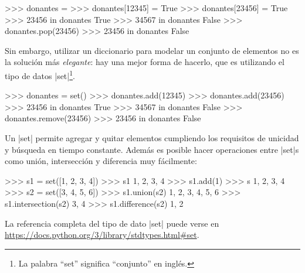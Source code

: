 \begin{subappendices}
\begin{codigo-python-sn}
>>> donantes = {}
>>> donantes[12345] = True
>>> donantes[23456] = True
>>> 23456 in donantes
True
>>> 34567 in donantes
False
>>> donantes.pop(23456)
>>> 23456 in donantes
False
\end{codigo-python-sn}

Sin embargo, utilizar un diccionario para modelar un conjunto de elementos no
es la solución más \emph{elegante}: hay una mejor forma de hacerlo, que es
utilizando el tipo de datos |set|\footnote{La palabra ``set'' significa
``conjunto'' en inglés.}.

\begin{codigo-python-sn}
>>> donantes = set()
>>> donantes.add(12345)
>>> donantes.add(23456)
>>> 23456 in donantes
True
>>> 34567 in donantes
False
>>> donantes.remove(23456)
>>> 23456 in donantes
False
\end{codigo-python-sn}

Un |set| permite agregar y quitar elementos cumpliendo los requisitos de
unicidad y búsqueda en tiempo constante. Además es posible hacer operaciones
entre |set|s como unión, intersección y diferencia muy fácilmente:

\begin{codigo-python-sn}
>>> s1 = set([1, 2, 3, 4])
>>> s1
{1, 2, 3, 4}
>>> s1.add(1)
>>> s
{1, 2, 3, 4}
>>> s2 = set([3, 4, 5, 6])
>>> s1.union(s2)
{1, 2, 3, 4, 5, 6}
>>> s1.intersection(s2)
{3, 4}
>>> s1.difference(s2)
{1, 2}
\end{codigo-python-sn}

La referencia completa del tipo de dato |set| puede verse en
\url{https://docs.python.org/3/library/stdtypes.html#set}.
\end{subappendices}
